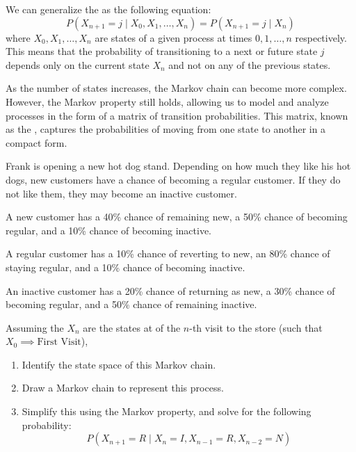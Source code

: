 We can generalize the  as the following equation:
$$P(X_{n+1}=j \mid X_0,X_1,\ldots,X_n)
    =
    P(X_{n+1}=j \mid X_n)$$
where $X_0, X_1, \ldots, X_n$ are states of a given process at times $0, 1, \ldots, n$ respectively. This means that the probability of transitioning to a next or future state $j$ depends only on the current state $X_n$ and not on any of the previous states.

As the number of states increases, the Markov chain can become more complex. However, the Markov property still holds, allowing us to model and analyze processes in the form of a matrix of transition probabilities. This matrix, known as the , captures the probabilities of moving from one state to another in a compact form.

\begin{Exercise}[title={Frank's Hot Dog Chain}, label={ex:markov_1}]
    Frank is opening a new hot dog stand. Depending on how much they like his hot dogs, new customers have a chance of becoming a regular customer. If they do not like them, they may become an inactive customer.

    A new customer has a 40\% chance of remaining new, a 50\% chance of becoming regular, and a 10\% chance of becoming inactive.

    A regular customer has a 10\% chance of reverting to new, an 80\% chance of staying regular, and a 10\% chance of becoming inactive.

    An inactive customer has a 20\% chance of returning as new, a 30\% chance of becoming regular, and a 50\% chance of remaining inactive.

    Assuming the $X_n$ are the states at of the $n$-th visit to the store (such that $X_0 \implies \text{First Visit}$),
    \begin{enumerate}
        \item Identify the state space of this Markov chain.
        \item Draw a Markov chain to represent this process.
        \item Simplify this using the Markov property, and solve for the following probability:
              $$P(X_{n+1}=R \mid X_n=I, X_{n-1}=R, X_{n-2}=N)$$
    \end{enumerate}
\end{Exercise}

